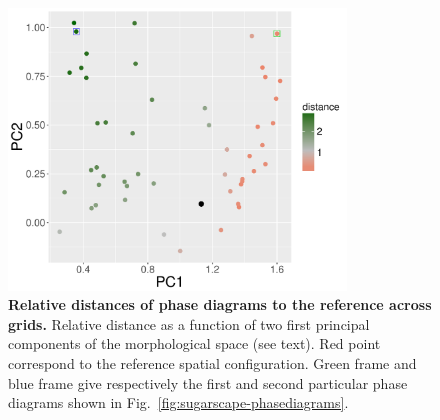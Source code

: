 \documentclass[Royal,sageh,times]{sagej}
\begin{document}

\begin{figure}
\centering
\includegraphics[width=0.8\textwidth]{figures/relativedistance_morphspace}
\caption{\textbf{Relative distances of phase diagrams to the reference across grids.} Relative distance as a function of two first principal components of the morphological space (see text). Red point correspond to the reference spatial configuration. Green frame and blue frame give respectively the first and second particular phase diagrams shown in Fig.~\ref{fig:sugarscape-phasediagrams}.}
\label{fig:sugarscape-distance-pca}
\end{figure}


\end{document}
